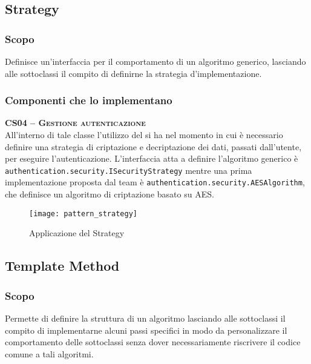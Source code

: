 \subsection{Strategy}\label{sec:patternstrategy}

\subsubsection{Scopo}
Definisce un'interfaccia per il comportamento di un algoritmo generico, lasciando alle sottoclassi il compito di definirne la strategia d'implementazione.

\subsubsection{Componenti che lo implementano}
\begin{description}

  \item{\scshape\bfseries CS04 -- Gestione autenticazione}\\
All'interno di tale classe l'utilizzo del  si ha nel momento in cui è necessario definire una strategia di criptazione e decriptazione dei dati, passati dall'utente, per eseguire l'autenticazione. L'interfaccia atta a definire l'algoritmo generico è \texttt{authentication.security.ISecurityStrategy} mentre una prima implementazione proposta dal team è \texttt{authentication.security.AESAlgorithm}, che definisce un algoritmo di criptazione basato su AES.

\begin{figure}[H]
  \centering
  \texttt{[image: pattern\_strategy]}
  \caption{Applicazione del  Strategy}\label{fig:strategy}
\end{figure}

\end{description}

\subsection{Template Method}
\subsubsection{Scopo}
Permette di definire la struttura di un algoritmo lasciando alle sottoclassi il compito di implementarne alcuni passi specifici in modo da personalizzare il comportamento delle sottoclassi senza dover necessariamente riscrivere il codice comune a tali algoritmi.

